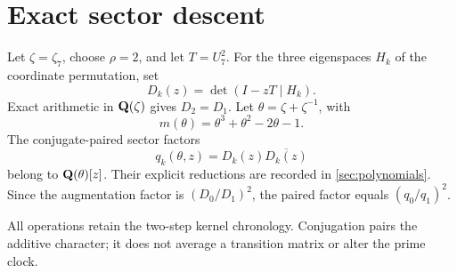 \section{Exact sector descent}

Let $\zeta=\zeta_7$, choose $\rho=2$, and let $T=U_7^2$.  For the three
eigenspaces $H_k$ of the coordinate permutation, set
\[
 D_k(z)=\det(I-zT\mid H_k).
\]
Exact arithmetic in $\mathbf Q(\zeta)$ gives $D_2=D_1$.  Let
$\theta=\zeta+\zeta^{-1}$, with
\[
 m(\theta)=\theta^3+\theta^2-2\theta-1.
\]
The conjugate-paired sector factors
\[
 q_k(\theta,z)=D_k(z)\overline{D_k(z)}
\]
belong to $\mathbf Q(\theta)[z]$.  Their explicit reductions are recorded in
\cref{sec:polynomials}.  Since the augmentation factor is $(D_0/D_1)^2$,
the paired factor equals $(q_0/q_1)^2$.

All operations retain the two-step kernel chronology.  Conjugation pairs the
additive character; it does not average a transition matrix or alter the
prime clock.

